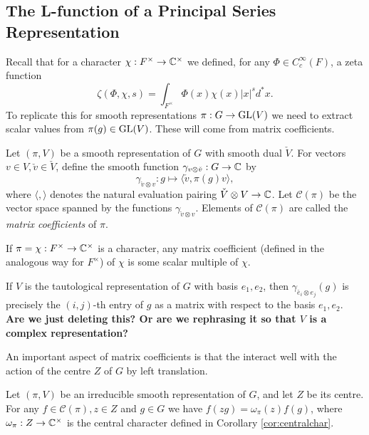 \subsection{The L-function of a Principal Series Representation}

Recall that for a character $\chi:F^\times \to \mathbb{C}^\times$ we defined, for any $\Phi \in C_c^\infty(F)$, a zeta function $$\zeta(\Phi,\chi,s) = \int_{F^\times} \Phi(x)\chi(x) |x|^s d^*x.$$
To replicate this for smooth representations $\pi : G \to \mathrm{GL}(V)$ we need to extract scalar values from $\pi(g) \in \mathrm{GL}(V)$. These will come from matrix coefficients.

\begin{defn}
Let $(\pi,V)$ be a smooth representation of $G$ with smooth dual $\check{V}$. For vectors $v\in V, \check{v} \in \check{V}$, define the smooth function $\gamma_{v \otimes \check{v}}: G \to \mathbb{C}$ by 
$$\gamma_{\check{v} \otimes v} : g \mapsto \langle \check{v},\pi(g) v \rangle,$$ where $\langle, \rangle$ denotes the natural evaluation pairing $\check{V} \otimes V \to \mathbb{C}$. Let $\mathcal C(\pi)$ be the vector space spanned by the functions $\gamma_{\check{v} \otimes v}$. Elements of $\mathcal C(\pi)$ are called the \textit{matrix coefficients} of $\pi$.
\end{defn}
\begin{rem}
    If $\pi=\chi:F^\times \to \mathbb{C}^\times$ is a character, any matrix coefficient (defined in the analogous way for $F^\times$) of $\chi$ is some scalar multiple of $\chi$.

    If $V$ is the tautological representation of $G$ with basis $e_1,e_2$, then $\gamma_{\check{e_i} \otimes e_j}(g)$ is precisely the $(i,j)$-th entry of $g$ as a matrix with respect to the basis $e_1,e_2$. \textbf{Are we just deleting this? Or are we rephrasing it so that $V$ is a complex representation?}
\end{rem}

\iffalse
\begin{defn}
    Let $(\pi,V)$ be an irreducible smooth representation of $G$. The centre $Z$ of $G$ acts on $V$ via the central character $\omega_\pi : Z \to \CC^\times$.
\end{defn}
\fi

An important aspect of matrix coefficients is that the interact well with the action of the centre $Z$ of $G$ by left translation. 

\begin{lemma}\label{central char}
    Let $(\pi,V)$ be an irreducible smooth representation of $G$, and let $Z$ be its centre. For any $f \in \mathcal C(\pi), z \in Z$ and $g \in G$ we have $f(zg) = \omega_\pi(z) f(g)$, where $\omega_\pi:Z\to\CC^\times$ is the central character defined in Corollary \ref{cor:centralchar}.
\end{lemma}


